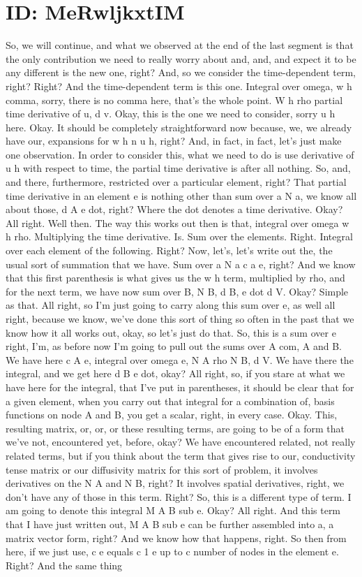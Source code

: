 \documentclass[10pt]{article}
\begin{document}
\section*{ID: MeRwljkxtIM}
So, we will continue, and what we observed at the end of the last segment is that the only contribution we need to really worry about and, and, and expect it to be any different is the new one, right? And, so we consider the time-dependent term, right? Right? And the time-dependent term is this one. Integral over omega, w h comma, sorry, there is no comma here, that's the whole point. W h rho partial time derivative of u, d v. Okay, this is the one we need to consider, sorry u h here. Okay. It should be completely straightforward now because, we, we already have our, expansions for w h n u h, right? And, in fact, in fact, let's just make one observation. In order to consider this, what we need to do is use derivative of u h with respect to time, the partial time derivative is after all nothing. So, and, and there, furthermore, restricted over a particular element, right? That partial time derivative in an element e is nothing other than sum over a N a, we know all about those, d A e dot, right? Where the dot denotes a time derivative. Okay? All right. Well then. The way this works out then is that, integral over omega w h rho. Multiplying the time derivative. Is. Sum over the elements. Right. Integral over each element of the following. Right? Now, let's, let's write out the, the usual sort of summation that we have. Sum over a N a c a e, right? And we know that this first parenthesis is what gives us the w h term, multiplied by rho, and for the next term, we have now sum over B, N B, d B, e dot d V. Okay? Simple as that. All right, so I'm just going to carry along this sum over e, as well all right, because we know, we've done this sort of thing so often in the past that we know how it all works out, okay, so let's just do that. So, this is a sum over e right, I'm, as before now I'm going to pull out the sums over A com, A and B. We have here c A e, integral over omega e, N A rho N B, d V. We have there the integral, and we get here d B e dot, okay? All right, so, if you stare at what we have here for the integral, that I've put in parentheses, it should be clear that for a given element, when you carry out that integral for a combination of, basis functions on node A and B, you get a scalar, right, in every case. Okay. This, resulting matrix, or, or, or these resulting terms, are going to be of a form that we've not, encountered yet, before, okay? We have encountered related, not really related terms, but if you think about the term that gives rise to our, conductivity tense matrix or our diffusivity matrix for this sort of problem, it involves derivatives on the N A and N B, right? It involves spatial derivatives, right, we don't have any of those in this term. Right? So, this is a different type of term. I am going to denote this integral M A B sub e. Okay? All right. And this term that I have just written out, M A B sub e can be further assembled into a, a matrix vector form, right? And we know how that happens, right. So then from here, if we just use, c e equals c 1 e up to c number of nodes in the element e. Right? And the same thing 
\end{document}
